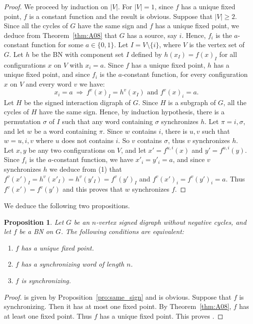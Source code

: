 \documentclass[11pt,letter]{article}
\newtheorem{proposition}{Proposition}
\newcommand{\BF}[1]{{{\boldmath{\bf #1}\unboldmath}}}
\newcommand{\B}{\{0,1\}}
\begin{document}
\begin{proof}
We proceed by induction on $|V|$. For $|V|=1$, since $f$ has a unique fixed point, $f$ is a constant function and the result is obvious. Suppose that $|V|\geq 2$. Since all the cycles of $G$ have the same sign and $f$ has a unique fixed point, we deduce from Theorem~\ref{thm:A08} that $G$ has a source, say $i$. Hence, $f_i$ is the $a$-constant function for some $a\in\B$. Let $I=V\setminus\{i\}$, where $V$ is the vertex set of $G$. Let $h$ be the BN with component set $I$ defined by $h(x_I)=f(x)_I$ for all configurations $x$ on $V$ with $x_i=a$. Since $f$ has a unique fixed point, $h$ has a unique fixed point, and since $f_i$ is the $a$-constant function, for every configuration $x$ on $V$ and every word $v$ we have:
\[\tag{1}
x_i=a~\Rightarrow~ f^v(x)_I=h^v(x_I)\textrm{ and }f^v(x)_i=a.
\]
Let $H$ be the signed interaction digraph of $G$. Since $H$ is a subgraph of $G$, all the cycles of $H$ have the same sign. Hence, by induction hypothesis, there is a permutation $\sigma$ of $I$ such that any word containing $\sigma$ synchronizes $h$. Let $\pi=i,\sigma$, and let $w$ be a word containing $\pi$. Since $w$ contains $i$, there is $u,v$ such that $w=u,i,v$ where $u$ does not contains $i$. So $v$ contains $\sigma$, thus $v$ synchronizes $h$. Let $x,y$ be any two configurations on $V$, and let $x'=f^{u,i}(x)$ and $y'=f^{u,i}(y)$. Since $f_i$ is the $a$-constant function, we have $x'_i=y'_i=a$, and since $v$ synchronizes $h$ we deduce from (1) that $f^v(x')_I=h^v(x'_I)=h^v(y'_I)=f^v(y')_I$ and $f^v(x')_i=f^v(y')_i=a$. Thus $f^v(x')=f^v(y')$ and this proves that $w$ synchronizes $f$. 
\end{proof}

We deduce the following two propositions. 

\begin{proposition}\label{pro:positive_G}
Let $G$ be an $n$-vertex signed digraph without negative cycles, and let $f$ be a BN on $G$. The following conditions are equivalent:
\begin{enumerate}
\item
$f$ has a unique fixed point.
\item
$f$ has a synchronizing word of length $n$. 
\item
$f$ is synchronizing.
\end{enumerate}
\end{proposition}

\begin{proof}
\BF{($1 \Rightarrow 2$)} is given by Proposition~\ref{pro:same_sign} and \BF{($2 \Rightarrow 3$)} is obvious. Suppose that $f$ is synchronizing. Then it has at most one fixed point. By Theorem~\ref{thm:A08}, $f$ has at least one fixed point. Thus $f$ has a unique fixed point. This proves \BF{($3 \Rightarrow 1$)}.
\end{proof}
\end{document}

